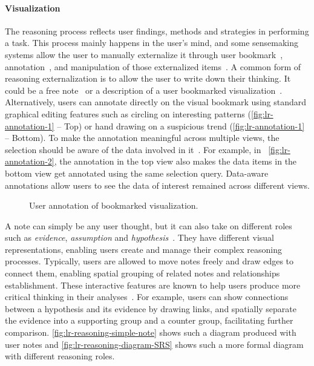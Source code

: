 \paragraph{Visualization}
The reasoning process reflects user findings, methods and strategies in performing a task. This process mainly happens in the user's mind, and some sensemaking systems allow the user to manually externalize it through user bookmark~\cite{Walker2013}, annotation~\cite{Heer2009}, and manipulation of those externalized items~\cite{Xu2014}. A common form of reasoning externalization is to allow the user to write down their thinking. It could be a free note~\cite{Shrinivasan2008} or a description of a user bookmarked visualization~\cite{Walker2013}. Alternatively, users can annotate directly on the visual bookmark using standard graphical editing features such as circling on interesting patterns (\autoref{fig:lr-annotation-1} -- Top) or hand drawing on a suspicious trend (\autoref{fig:lr-annotation-1} -- Bottom). To make the annotation meaningful across multiple views, the selection should be aware of the data involved in it~\cite{Heer2008a}. For example, in~ \autoref{fig:lr-annotation-2}, the annotation in the top view also makes the data items in the bottom view get annotated using the same selection query. Data-aware annotations allow users to see the data of interest remained across different views.

\begin{figure}[!htb]
\centering
{} 
\hfill
{}
\caption{User annotation of bookmarked visualization.}
\label{fig:lr-annotation}
\end{figure}

A note can simply be any user thought, but it can also take on different roles such as \emph{evidence}, \emph{assumption} and \emph{hypothesis}~\cite{Pike2009}. They have different visual representations, enabling users create and manage their complex reasoning processes. Typically, users are allowed to move notes freely and draw edges to connect them, enabling spatial grouping of related notes and relationships establishment. These interactive features are known to help users produce more critical thinking in their analyses~\cite{Sedig2013}. For example, users can show connections between a hypothesis and its evidence by drawing links, and spatially separate the evidence into a supporting group and a counter group, facilitating further comparison. \autoref{fig:lr-reasoning-simple-note} shows such a diagram produced with user notes and \autoref{fig:lr-reasoning-diagram-SRS} shows such a more formal diagram with different reasoning roles.


